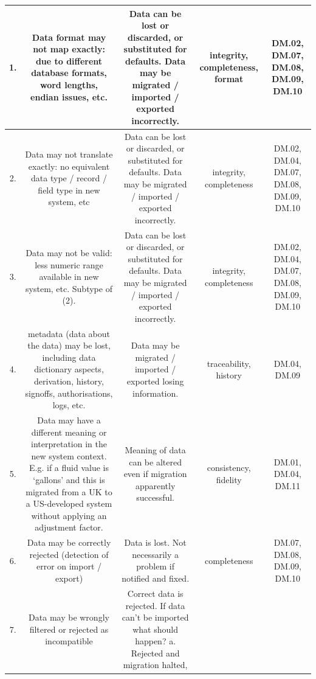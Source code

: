 \begin{longtable}{|C{}|C{}|C{}|C{}|C{}|}
1.&
Data format may not map exactly: due to different \gls{database} formats, word lengths, endian issues, etc.&
Data can be lost or discarded, or substituted for defaults. Data may be migrated / imported / exported incorrectly.&
\Gls{integrity}, \gls{completeness}, \gls{format}&
DM.02, DM.07, DM.08, DM.09, DM.10\\\hline
%
2.&
Data may not translate exactly: no equivalent data type / record / field type in new system, etc&
Data can be lost or discarded, or substituted for defaults. Data may be migrated / imported / exported incorrectly.&
\Gls{integrity}, \gls{completeness}&
DM.02, DM.04, DM.07, DM.08, DM.09, DM.10\\\hline
%
3.&
Data may not be valid: less numeric range available in new system, etc. Subtype of (2).&
Data can be lost or discarded, or substituted for defaults. Data may be migrated / imported / exported incorrectly.&
\Gls{integrity}, \gls{completeness}&
DM.02, DM.04, DM.07, DM.08, DM.09, DM.10\\\hline
%
4.&
\Gls{metadata} (data about the data) may be lost, including \gls{data dictionary} aspects, derivation, history, signoffs, authorisations,
logs, etc.&
Data may be migrated / imported / exported losing \gls{information}.&
\Gls{traceability}, \gls{history}&
DM.04, DM.09\\\hline
%
5.&
Data may have a different meaning or interpretation in the new system context.
E.g. if a fluid value is ‘gallons’ and this is migrated from a UK to a US-developed system without applying an adjustment factor.&
Meaning of data can be altered even if migration apparently successful.&
\Gls{consistency}, \gls{fidelity} &
DM.01, DM.04, DM.11\\\hline
%
6.
&
Data may be correctly rejected (detection of error on import / export)&
Data is lost. Not necessarily a problem if notified and fixed.&
\Gls{completeness}&
DM.07, DM.08, DM.09, DM.10\\\hline
%
7.
&
Data may be wrongly filtered or rejected as incompatible&
Correct data is rejected. If data can’t be imported what should happen? a. Rejected and migration halted,

\end{longtable}
